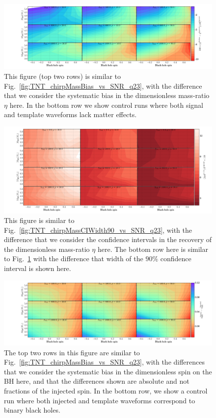 \documentclass[aps,prd,amsmath,floats,floatfix, twocolumn,
superscriptaddress,nofootinbib,showpacs]{revtex4-1}
\begin{document}
\begin{figure}[!t]
\centering    
\includegraphics[trim={{0.4\columnwidth} 0 0 0},width=2.2\columnwidth]{plots-TN/TN_EtaBiases_Lambda_SNR.pdf}
\caption{This figure (top two rows) is similar to Fig.~\ref{fig:TNT_chirpMassBias_vs_SNR_q23},
with the difference that we consider the systematic bias in the dimensionless
mass-ratio $\eta$ here. In the bottom row we show control runs where both
signal and template waveforms lack matter effects.}
\label{fig:TNT_EtaBias_vs_SNR_q23}
\end{figure}
% 
\begin{figure}
\centering    
\includegraphics[trim={{0.4\columnwidth} 0 0 0},width=2.2\columnwidth]{plots-TN/TN_EtaCIWidths68_3_Lambda_SNR.pdf}
\caption{This figure is similar to
Fig.~\ref{fig:TNT_chirpMassCIWidth90_vs_SNR_q23},
  with the difference that we consider the confidence intervals in the recovery
  of the dimensionless mass-ratio $\eta$ here. The bottom row here is similar to 
  Fig.~\ref{fig:TNT_EtaBias_vs_SNR_q23} with the difference that width of the $90\%$
  confidence interval is shown here.}
\label{fig:TNT_EtaCIWidth90_vs_SNR_q23}
\end{figure}
% 
\begin{figure}
\centering
\includegraphics[trim={{0.4\columnwidth} 0 0 0},width=2.2\columnwidth]{plots-TN/TN_ChiBHBiases_CI90_0_Lambda_SNR.pdf}
\caption{The top two rows in this figure are
similar to Fig.~\ref{fig:TNT_chirpMassBias_vs_SNR_q23},
with the differences that we consider the systematic bias in the dimensionless
spin on the BH here, and that the differences shown are absolute and not
fractions of the injected spin. In the bottom row, we show a control run where
both injected and template waveforms correspond to binary black holes.}
\label{fig:TNT_BHspinBias_vs_SNR_q23}
\end{figure}
\end{document}

